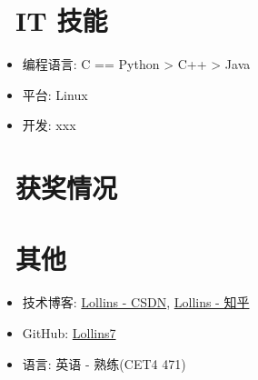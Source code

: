 \documentclass{resume}
\begin{document}

\section{\faCogs\ IT 技能}
\begin{itemize}[parsep=0.5ex]
  \item 编程语言: C == Python > C++ > Java
  \item 平台: Linux
  \item 开发: xxx
\end{itemize}

\section{\faHeartO\ 获奖情况}

\section{\faInfo\ 其他}
\begin{itemize}[parsep=0.5ex]
  \item 技术博客: \href{https://blog.csdn.net/weixin_61210500?spm=1000.2115.3001.5343}{Lollins - CSDN}, \href{https://www.zhihu.com/people/hun-kou-fan-chi-98-73}{Lollins - 知乎}
  \item GitHub: \href{https://github.com/Lollins7}{Lollins7}
  \item 语言: 英语 - 熟练(CET4 471)
\end{itemize}

%
%
\end{document}
